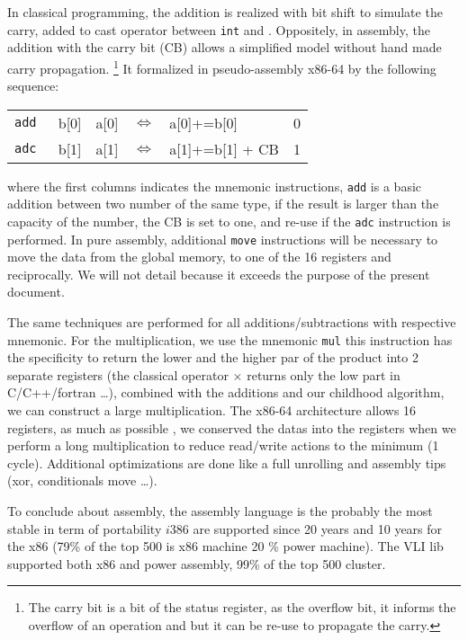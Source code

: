\documentclass[11pt]{amsart}
\begin{document}
In classical programming, the addition is realized with bit shift to simulate the carry, added to cast operator between  \texttt{int} and . Oppositely, 
in assembly, the addition with the carry bit (CB) allows a simplified model without hand made carry propagation. \footnote{ The carry bit is a bit of the status register, as the overflow bit, 
it informs  the overflow of an operation and but it can be re-use to propagate the carry. }  It formalized in pseudo-assembly x86-64 by the following sequence:
\begin{table}[htdp]
\begin{center}
\begin{tabular}{ l c c c l c}
 \texttt{add }   &  b[0]  & a[0]    & $\Leftrightarrow$ & a[0]+=b[0]            & \tiny{0}  \\ 
 \texttt{adc }   &  b[1]   & a[1]   & $\Leftrightarrow$ & a[1]+=b[1] + CB  & \tiny{1}  \\  
\end{tabular}
\end{center}
\end{table}%
where the first columns indicates the  mnemonic instructions, \texttt{add} is a basic addition between two number of the same type, if the result is larger than the capacity of the number, the CB is set to one,
and re-use if the \texttt{adc} instruction is performed. In pure assembly, additional \texttt{move} instructions will be necessary to move the data from the global memory, to one of the 16 registers and reciprocally.
We will not detail because it exceeds the purpose of the present document. 

The same techniques are performed for all additions/subtractions with respective mnemonic. For the multiplication, we use the mnemonic \texttt{mul} this instruction has the specificity to return the lower and the higher
par of the product into 2 separate registers (the classical operator $\times$ returns only the low part in C/C++/fortran \dots), combined with the additions and our childhood algorithm, we can construct a large multiplication.  
The x86-64 architecture allows 16 registers, as much as possible , we conserved the datas into the registers when we perform a long multiplication to reduce read/write actions to the minimum (1 cycle).
Additional optimizations are done like a full unrolling and assembly tips (xor, conditionals move \dots). 

To conclude about assembly, the assembly language is the probably the most stable in term of portability $i386$ are supported since 20 years and 10 years for the x86 (79\% of the top 500 is x86 machine 20 \% power machine).
The VLI lib supported both x86 and power assembly, 99\% of the top 500 cluster.   
\end{document}

